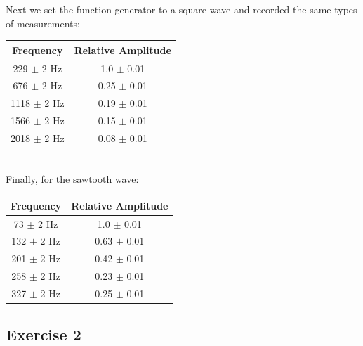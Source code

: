 \documentclass[a4paper,12pt]{article}
\begin{document}
Next we set the function generator to a square wave and recorded the
same types of measurements: \\

\begin{tabular}{c | c}
  Frequency & Relative Amplitude \\
  \hline
  229 $\pm$ 2 Hz & 1.0 $\pm$ 0.01 \\
  676 $\pm$ 2 Hz & 0.25 $\pm$ 0.01 \\
  1118 $\pm$ 2 Hz & 0.19 $\pm$ 0.01 \\
  1566 $\pm$ 2 Hz & 0.15 $\pm$ 0.01 \\
  2018 $\pm$ 2 Hz & 0.08 $\pm$ 0.01 \\
\end{tabular} \\

Finally, for the sawtooth wave: \\

\begin{tabular}{c | c}
  Frequency & Relative Amplitude \\
  \hline
  73 $\pm$ 2 Hz & 1.0 $\pm$ 0.01 \\
  132 $\pm$ 2 Hz & 0.63 $\pm$ 0.01 \\
  201 $\pm$ 2 Hz & 0.42 $\pm$ 0.01 \\
  258 $\pm$ 2 Hz & 0.23 $\pm$ 0.01 \\
  327 $\pm$ 2 Hz & 0.25 $\pm$ 0.01 \\
\end{tabular}

\subsection{Exercise 2}
\end{document}

